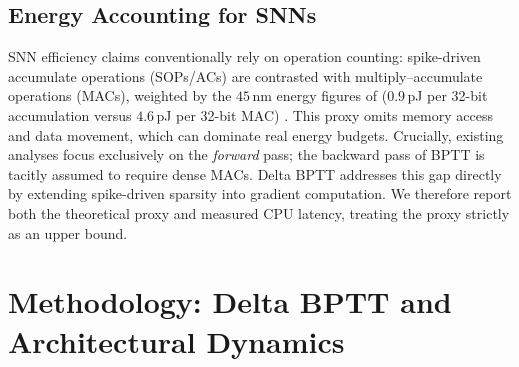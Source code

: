 \documentclass[runningheads]{llncs}
\begin{document}
\subsection{Energy Accounting for SNNs}
SNN efficiency claims conventionally rely on operation counting: spike-driven accumulate operations (SOPs/ACs) are contrasted with multiply--accumulate operations (MACs), weighted by the $45$\,nm energy figures of \cite{horowitz2014computing} ($0.9$\,pJ per 32-bit accumulation versus $4.6$\,pJ per 32-bit MAC) \cite{zhou2023spikformer,fang2023spikingjelly}. This proxy omits memory access and data movement, which can dominate real energy budgets. Crucially, existing analyses focus exclusively on the \textit{forward} pass; the backward pass of BPTT is tacitly assumed to require dense MACs. Delta BPTT addresses this gap directly by extending spike-driven sparsity into gradient computation. We therefore report both the theoretical proxy and measured CPU latency, treating the proxy strictly as an upper bound.

\section{Methodology: Delta BPTT and Architectural Dynamics}
\end{document}
